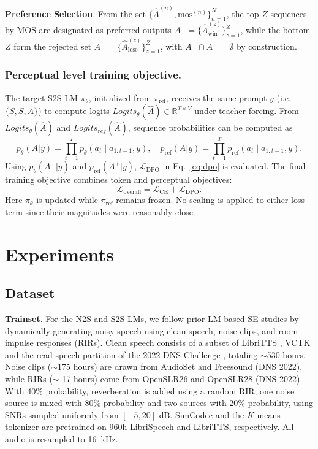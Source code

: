 \documentclass{article}
\begin{document}
\textbf{Preference Selection}. From the set $\{\hat{A}^{(n)}, \text{mos}^{(n)}\}_{n=1}^N$, the top-$Z$ sequences by MOS are designated as preferred outputs $A^+=\{\hat{A}^{(z)}_{\text{win}}\}_{z=1}^Z$, while the bottom-$Z$ form the rejected set $A^-=\{\hat{A}^{(z)}_{\text{lose}}\}_{z=1}^Z$, with $A^+\cap A^-=\emptyset$ by construction.


\subsubsection{Perceptual level training objective.}
The target S2S LM $\pi_\theta$, initialized from $\pi_{\text{ref}}$, receives the same prompt $y$ (i.e. $\{\bar{S}, S, \bar{A}\}$) to compute logits $Logits_\theta(\hat{A})\in\mathbb{R}^{T\times V}$ under teacher forcing. From $Logits_\theta(\hat{A})$ and $Logits_{ref}(\hat{A})$, sequence probabilities can be computed as
\[
p_\theta(A|y)=\prod_{t=1}^{T} p_\theta(a_t \mid a_{1:t-1},y),\quad
p_{\text{ref}}(A|y)=\prod_{t=1}^{T} p_{\text{ref}}(a_t \mid a_{1:t-1},y).
\]
Using $p_\theta(A^\pm|y)$ and $p_{\text{ref}}(A^\pm|y)$, $\mathcal{L}_{\text{DPO}}$ in Eq.~\ref{eq:dpo} is evaluated. The final training objective combines token and perceptual objectives:
\[
\mathcal{L}_{\text{overall}} = \mathcal{L}_{\text{CE}} + \mathcal{L}_{\text{DPO}}.
\]
Here $\pi_\theta$ is updated while $\pi_{\text{ref}}$ remains frozen. No scaling is applied to either loss term since their magnitudes were reasonably close.


\section{Experiments}
\subsection{Dataset}
\textbf{Trainset}. For the N2S and S2S LMs, we follow prior LM-based SE studies \cite{wang2024selm, li2024masksr, yao2025gense} by dynamically generating noisy speech using clean speech, noise clips, and room impulse responses (RIRs). Clean speech consists of a subset of LibriTTS \cite{zen2019libritts}, VCTK and the read speech partition of the 2022 DNS Challenge \cite{dubey2022icassp}, totaling $\sim$530 hours. Noise clips ($\sim$175 hours) are drawn from AudioSet and Freesound (DNS 2022), while RIRs ($\sim$ 17 hours) come from OpenSLR26 and OpenSLR28 (DNS 2022). With 40\% probability, reverberation is added using a random RIR; one noise source is mixed with 80\% probability and two sources with 20\% probability, using SNRs sampled uniformly from $[-5, 20]$ dB. SimCodec and the $K$-means tokenizer are pretrained on 960h LibriSpeech \cite{panayotov2015librispeech} and LibriTTS, respectively. All audio is resampled to 16~kHz.
\end{document}
